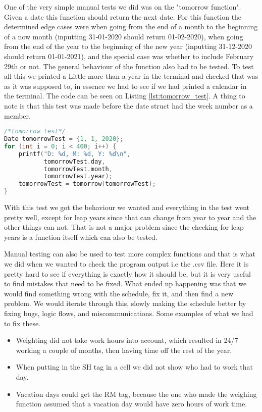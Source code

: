 One of the very simple manual tests we did was on the "tomorrow function". Given a date this function should return the next date. For this function the determined edge cases were when going from the end of a month to the beginning of a now month (inputting 31-01-2020 should return 01-02-2020), when going from the end of the year to the beginning of the new year (inputting 31-12-2020 should return 01-01-2021), and the special case was whether to include February 29th or not. The general behaviour of the function also had to be tested. To test all this we printed a Little more than a year in the terminal and checked that was as it was supposed to, in essence we had to see if we had printed a calendar in the terminal. The code can be seen on Listing \ref{lst:tomorrow_test}. A thing to note is that this test was made before the date struct had the week number as a member. 

\begin{lstlisting}[caption={tomorrow function testing.}, label={lst:tomorrow_test}, language=c]
/*tomorrow test*/
Date tomorrowTest = {1, 1, 2020};
for (int i = 0; i < 400; i++) {
    printf("D: %d, M: %d, Y: %d\n", 
           tomorrowTest.day,
           tomorrowTest.month,
           tomorrowTest.year);
    tomorrowTest = tomorrow(tomorrowTest);
}
\end{lstlisting}

With this test we got the behaviour we wanted and everything in the test went pretty well, except for leap years since that can change from year to year and the other things can not. That is not a major problem since the checking for leap years is a function itself which can also be tested. 

Manual testing can also be used to test more complex functions and that is what we did when we wanted to check the program output i.e the .csv file. Here it is pretty hard to see if everything is exactly how it should be, but it is very useful to find mistakes that need to be fixed. What ended up happening was that we would find something wrong with the schedule, fix it, and then find a new problem. We would iterate through this, slowly making the schedule better by fixing bugs, logic flows, and miscommunications. Some examples of what we had to fix these.

\begin{itemize}
    \item Weighting did not take work hours into account, which resulted in 24/7 working a couple of months, then having time off the rest of the year.
    \item When putting in the SH tag in a cell we did not show who had to work that day.
    \item Vacation days could get the RM tag, because the one who made the weighing function assumed that a vacation day would have zero hours of work time.
\end{itemize}

